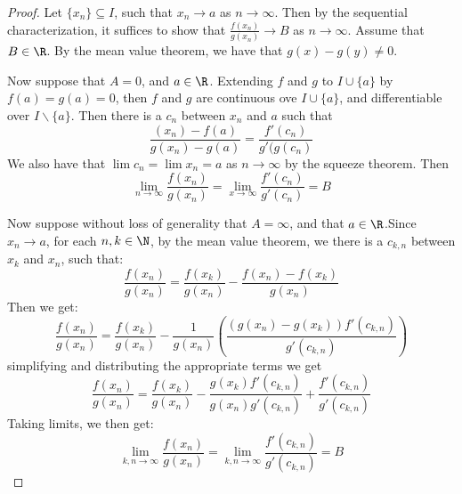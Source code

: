 \begin{proof}
    Let $\{x_n\} \subseteq I$, such that  $x_n \rightarrow a$ as  $n \rightarrow \infty$. Then by the sequential 
    characterization, it suffices to show that  $ \frac{f(x_n)}{g(x_n)} \rightarrow B$ as 
    $n \rightarrow \infty$. Assume that $B \in \R$. By the mean value theorem, we have 
    that  $g(x)-g(y) \neq 0$.

    Now suppose that  $A=0$, and  $a \in \R$. Extending  $f$ and  $g$ to  $I \cup \{a\}$ by 
    $f(a)=g(a)=0$, then  $f$ and  $g$ are continuous ove  $I \cup \{a\}$, and differentiable 
    over  $I \backslash \{a\}$. Then there is a $c_n$ between  $x_n$ and  $a$ such that 
        \begin{equation*}
            \frac{(x_n)-f(a)}{g(x_n)-g(a)}=\frac{f'(c_n)}{g'(g(c_n)}
        \end{equation*}
    We also have that $\lim{c_n}=\lim{x_n}=a$ as  $n \rightarrow \infty$ by the squeeze theorem.  
    Then 
        \begin{equation*}
            \lim_{n \rightarrow \infty}\frac{f(x_n)}{g(x_n)}=\lim_{x \rightarrow \infty}\frac{f'(c_n)}{g'(c_n)}=B
        \end{equation*}

    Now suppose without loss of generality that $A=\infty$, and that  $a \in \R$.Since $x_n \rightarrow a$, 
    for each $n,k \in \N$, by the mean value theorem, we there is a  $c_{k,n}$ between  
    $x_k$ and $x_n$, such that:
        \begin{equation*}
            \frac{f(x_n)}{g(x_n)}=\frac{f(x_k)}{g(x_n)}-\frac{f(x_n)-f(x_k)}{g(x_n)}
        \end{equation*}
    Then we get:
        \begin{equation*}
            \frac{f(x_n)}{g(x_n)}=\frac{f(x_k)}{g(x_n)}-\frac{1}{g(x_n)}
                                (\frac{(g(x_n)-g(x_k))f'(c_{k,n})}{g'(c_{k,n})})
        \end{equation*}
    simplifying and distributing the appropriate terms we get
        \begin{equation*}
            \frac{f(x_n)}{g(x_n)}=\frac{f(x_k)}{g(x_n)}-\frac{g(x_k)f'(c_{k,n})}{g(x_n)g'(c_{k,n})}
            +\frac{f'(c_{k,n})}{g'(c_{k,n})}
        \end{equation*} 
    Taking limits, we then get:
        \begin{equation*}
            \lim_{k,n \rightarrow \infty}{\frac{f(x_n)}{g(x_n)}}=
            \lim_{k,n \rightarrow \infty}{\frac{f'(c_{k,n})}{g'(c_{k,n})}}=B
        \end{equation*}
    

\end{proof}
